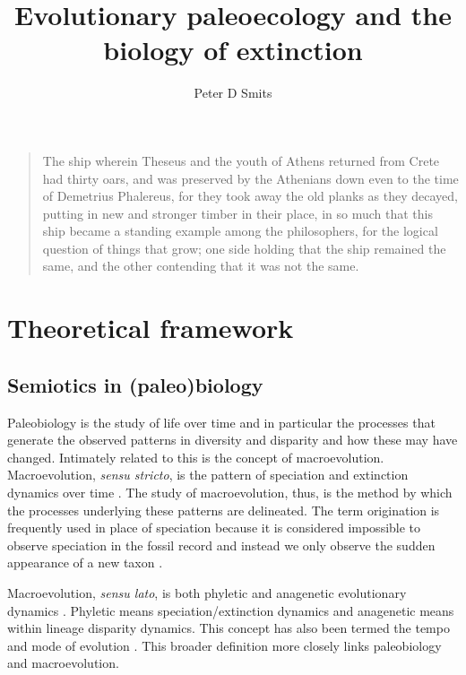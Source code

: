 \documentclass[12pt,letterpaper]{article}
\title{Evolutionary paleoecology and the biology of extinction}
\author[1]{Peter D Smits}
\affil[1]{\footnotesize{\href{mailto:psmits@uchicago.edu}{psmits@uchicago.edu}, Committee on Evolutionary Biology, University of Chicago}}
\begin{document}
\maketitle

\linenumbers
\modulolinenumbers[2]

\small{
\begin{quotation}
  The ship wherein Theseus and the youth of Athens returned from Crete had thirty oars, and was preserved by the Athenians down even to the time of Demetrius Phalereus, for they took away the old planks as they decayed, putting in new and stronger timber in their place, in so much that this ship became a standing example among the philosophers, for the logical question of things that grow; one side holding that the ship remained the same, and the other contending that it was not the same.

\end{quotation}
}

\section{Theoretical framework}
\subsection{Semiotics in (paleo)biology}

Paleobiology is the study of life over time and in particular the processes that generate the observed patterns in diversity and disparity and how these may have changed.  %
Intimately related to this is the concept of macroevolution. Macroevolution, \textit{sensu stricto}, is the pattern of speciation and extinction dynamics over time \citep{Jablonski2008a}. The study of macroevolution, thus, is the method by which the processes underlying these patterns are delineated. The term origination is frequently used in place of speciation because it is considered impossible to observe speciation in the fossil record and instead we only observe the sudden appearance of a new taxon \citep{Coyne2004}.

Macroevolution, \textit{sensu lato}, is both phyletic and anagenetic evolutionary dynamics \citep{Foote2007b}. Phyletic means speciation/extinction dynamics and anagenetic means within lineage disparity dynamics. This concept has also been termed the tempo and mode of evolution \citep{Simpson1944}. This broader definition more closely links paleobiology and macroevolution.
\end{document}
